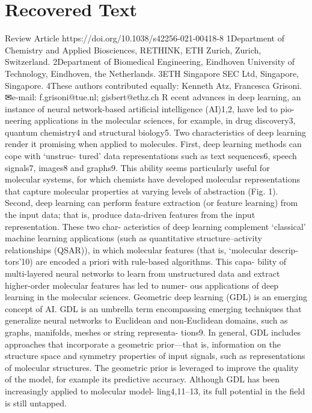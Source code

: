 \section{Recovered Text}
Review Article
https://doi.org/10.1038/s42256-021-00418-8
1Department of Chemistry and Applied Biosciences, RETHINK, ETH Zurich, Zurich, Switzerland. 2Department of Biomedical Engineering, Eindhoven
University of Technology, Eindhoven, the Netherlands. 3ETH Singapore SEC Ltd, Singapore, Singapore. 4These authors contributed equally: Kenneth Atz,
Francesca Grisoni. ✉e-mail: f.grisoni@tue.nl; gisbert@ethz.ch
R
ecent advances in deep learning, an instance of neural
network-based artificial intelligence (AI)1,2, have led to pio-
neering applications in the molecular sciences, for example, in
drug discovery3, quantum chemistry4 and structural biology5. Two
characteristics of deep learning render it promising when applied
to molecules. First, deep learning methods can cope with ‘unstruc-
tured’ data representations such as text sequences6, speech signals7,
images8 and graphs9. This ability seems particularly useful for
molecular systems, for which chemists have developed molecular
representations that capture molecular properties at varying levels
of abstraction (Fig. 1). Second, deep learning can perform feature
extraction (or feature learning) from the input data; that is, produce
data-driven features from the input representation. These two char-
acteristics of deep learning complement ‘classical’ machine learning
applications (such as quantitative structure–activity relationships
(QSAR)), in which molecular features (that is, ‘molecular descrip-
tors’10) are encoded a priori with rule-based algorithms. This capa-
bility of multi-layered neural networks to learn from unstructured
data and extract higher-order molecular features has led to numer-
ous applications of deep learning in the molecular sciences.
Geometric deep learning (GDL) is an emerging concept of
AI. GDL is an umbrella term encompassing emerging techniques
that generalize neural networks to Euclidean and non-Euclidean
domains, such as graphs, manifolds, meshes or string representa-
tions9. In general, GDL includes approaches that incorporate a
geometric prior—that is, information on the structure space and
symmetry properties of input signals, such as representations of
molecular structures. The geometric prior is leveraged to improve
the quality of the model, for example its predictive accuracy.
Although GDL has been increasingly applied to molecular model-
ling4,11–13, its full potential in the field is still untapped.
